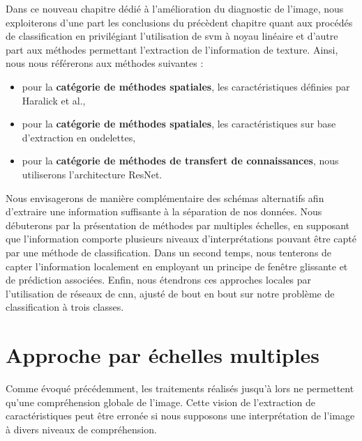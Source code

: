 Dans ce nouveau chapitre dédié à l'amélioration du diagnostic de l'image, nous exploiterons d'une part les conclusions du précèdent chapitre quant aux procédés de classification en privilégiant l'utilisation de \gls{svm} à noyau linéaire et d'autre part aux méthodes permettant l'extraction de l'information de texture. Ainsi, nous nous référerons aux méthodes suivantes :
\begin{itemize}
    \item pour la \textbf{catégorie de méthodes spatiales}, les caractéristiques définies par Haralick et al.,
    \item pour la \textbf{catégorie de méthodes spatiales}, les caractéristiques sur base d'extraction en ondelettes,
    \item pour la \textbf{catégorie de méthodes de transfert de connaissances}, nous utiliserons l'architecture ResNet.
\end{itemize}\par

Nous envisagerons de manière complémentaire des schémas alternatifs afin d'extraire une information suffisante à la séparation de nos données. Nous débuterons par la présentation de méthodes par multiples échelles, en supposant que l'information comporte plusieurs niveaux d'interprétations pouvant être capté par une méthode de classification. Dans un second temps, nous tenterons de capter l'information localement en employant un principe de fenêtre glissante et de prédiction associées. Enfin, nous étendrons ces approches locales par l'utilisation de réseaux de \gls{cnn}, ajusté de bout en bout sur notre problème de classification à trois classes.\par
\clearpage

\section{Approche par échelles multiples}
Comme évoqué précédemment, les traitements réalisés jusqu'à lors ne permettent qu'une compréhension globale de l'image. Cette vision de l'extraction de caractéristiques peut être erronée si nous supposons une interprétation de l'image à divers niveaux de compréhension.\par

